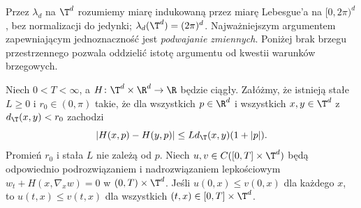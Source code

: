 Przez $\lambda_d$ na $\T^d$ rozumiemy miarę indukowaną
przez miarę Lebesgue'a na $[0,2\pi)^d$, bez normalizacji
do jedynki; $\lambda_d(\T^d)=(2\pi)^d$.
Najważniejszym argumentem zapewniającym jednoznaczność
jest \emph{podwajanie zmiennych}. Poniżej brak brzegu
przestrzennego pozwala oddzielić istotę argumentu
od kwestii warunków brzegowych.

\begin{twierdzenie}
\label{thm:pde23-comparison}
Niech $0<T<\infty$, a $H\colon\T^d\times\R^d\to\R$
będzie ciągły. Załóżmy, że istnieją stałe $L\ge0$
i $r_0\in(0,\pi)$ takie, że dla wszystkich $p\in\R^d$
i wszystkich $x,y\in\T^d$ z $d_{\T}(x,y)<r_0$ zachodzi
\begin{equation}\label{eq:pde23-HxLip}
 |H(x,p)-H(y,p)|\le Ld_{\T}(x,y)(1+|p|).
\end{equation}
Promień $r_0$ i stała $L$ nie zależą od $p$.
Niech $u,v\in C([0,T]\times\T^d)$ będą odpowiednio
podrozwiązaniem i nadrozwiązaniem lepkościowym
$w_t+H(x,\nabla_x w)=0$ w $(0,T)\times\T^d$.
Jeśli $u(0,x)\le v(0,x)$ dla każdego $x$, to
$u(t,x)\le v(t,x)$ dla wszystkich $(t,x)\in[0,T]\times\T^d$.
\end{twierdzenie}
